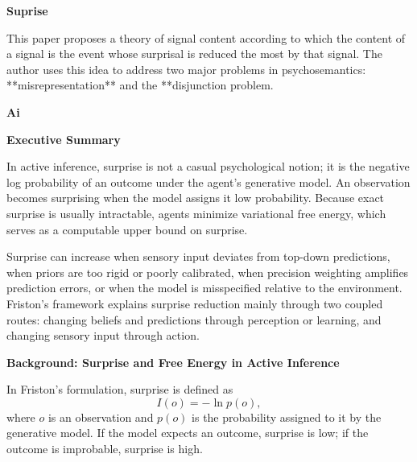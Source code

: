 \documentclass{book}
\providecommand{\ProjectDeepHeading}[2]{%
    \par\medskip\noindent\textbf{#2}\par\smallskip
}
\begin{document}

% 

\ProjectDeepHeading{9}{Suprise}


\cite{weissglass-2019-greatest-surprise-reduction-semantics-an-information-theoretic-solution-to-misrepresentation-and-disjunction} This paper proposes a theory of signal content according to which the content of a signal is the event whose surprisal is reduced the most by that signal. The author uses this idea to address two major problems in psychosemantics: **misrepresentation** and the **disjunction problem.

\ProjectDeepHeading{10}{Ai}


\ProjectDeepHeading{13}{Executive Summary}
        In active inference, surprise is not a casual psychological notion; it is the negative log probability of an outcome under the agent's generative model. An observation becomes surprising when the model assigns it low probability. Because exact surprise is usually intractable, agents minimize variational free energy, which serves as a computable upper bound on surprise.
        
        Surprise can increase when sensory input deviates from top-down predictions, when priors are too rigid or poorly calibrated, when precision weighting amplifies prediction errors, or when the model is misspecified relative to the environment. Friston's framework explains surprise reduction mainly through two coupled routes: changing beliefs and predictions through perception or learning, and changing sensory input through action.
    
    
    \ProjectDeepHeading{13}{Background: Surprise and Free Energy in Active Inference}
        In Friston's formulation, surprise is defined as
        \begin{equation}
            I(o) = -\ln p(o),
        \end{equation}
        where $o$ is an observation and $p(o)$ is the probability assigned to it by the generative model. If the model expects an outcome, surprise is low; if the outcome is improbable, surprise is high.
        
\end{document}
